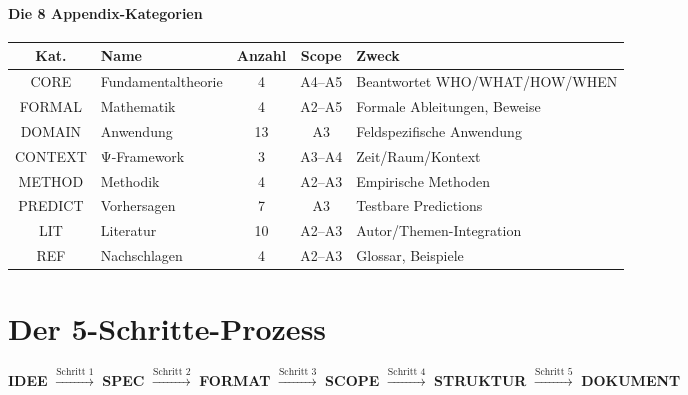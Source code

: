 \documentclass[12pt,a4paper]{article}
\begin{document}
\subsection{Die 8 Appendix-Kategorien}

\begin{table}[htbp]
\centering
\renewcommand{\arraystretch}{1.3}
\small
\begin{tabular}{@{}clccp{5cm}@{}}
\toprule
\textbf{Kat.} & \textbf{Name} & \textbf{Anzahl} & \textbf{Scope} & \textbf{Zweck} \\
\midrule
\cellcolor{bcmred!20}CORE & Fundamentaltheorie & 4 & A4--A5 & Beantwortet WHO/WHAT/HOW/WHEN \\
FORMAL & Mathematik & 4 & A2--A5 & Formale Ableitungen, Beweise \\
DOMAIN & Anwendung & 13 & A3 & Feldspezifische Anwendung \\
CONTEXT & Ψ-Framework & 3 & A3--A4 & Zeit/Raum/Kontext \\
METHOD & Methodik & 4 & A2--A3 & Empirische Methoden \\
PREDICT & Vorhersagen & 7 & A3 & Testbare Predictions \\
LIT & Literatur & 10 & A2--A3 & Autor/Themen-Integration \\
REF & Nachschlagen & 4 & A2--A3 & Glossar, Beispiele \\
\bottomrule
\end{tabular}
\end{table}


%
%

\part{Der 5-Schritte-Prozess}

\begin{tcolorbox}[colback=bcmgreen!10!white, colframe=bcmgreen, 
    title=\textbf{Von der Idee zum Dokument in 5 Schritten}]

\begin{center}
\Large
\textbf{IDEE} $\xrightarrow{\text{Schritt 1}}$ 
\textbf{SPEC} $\xrightarrow{\text{Schritt 2}}$ 
\textbf{FORMAT} $\xrightarrow{\text{Schritt 3}}$ 
\textbf{SCOPE} $\xrightarrow{\text{Schritt 4}}$ 
\textbf{STRUKTUR} $\xrightarrow{\text{Schritt 5}}$ 
\textbf{DOKUMENT}
\end{center}

\end{tcolorbox}
\end{document}
